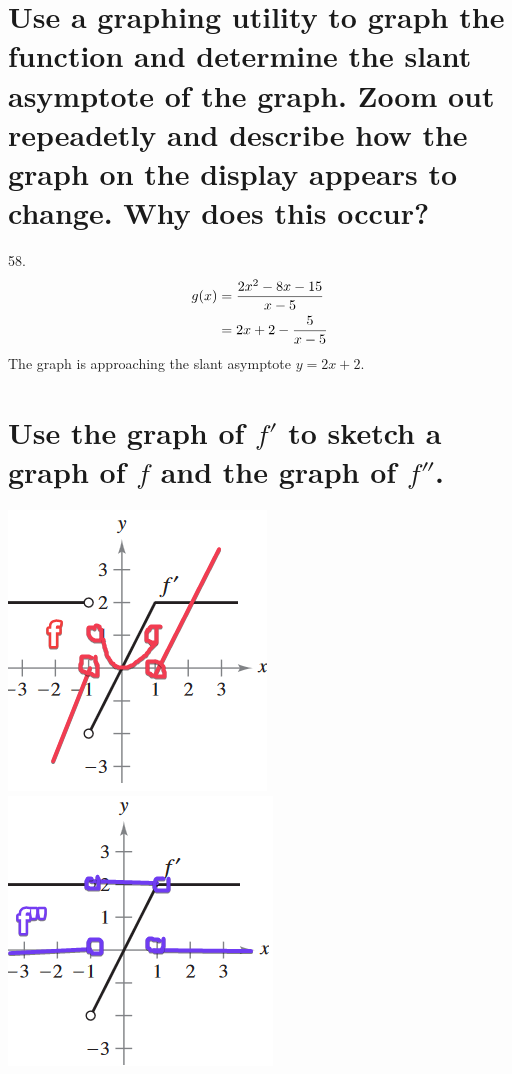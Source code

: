 \documentclass[11pt]{article}
\newcommand*{\set}{\setcounter{equation}{0}}
\begin{document}
\section{Use a graphing utility to graph the function and determine the slant asymptote of the graph. Zoom out repeadetly and describe how the graph on the display appears to change. Why does this occur?}
58.\begin{align}
    \set
    g(x)&=\frac{2x^2-8x-15}{x-5}\\
    &=2x+2-\frac{5}{x-5}
\end{align}
The graph is approaching the slant asymptote $y=2x+2$.

\section{Use the graph of $f'$ to sketch a graph of $f$ and the graph of $f''$.}
\includegraphics{64a.png}
\includegraphics{64b.png}
\end{document}
